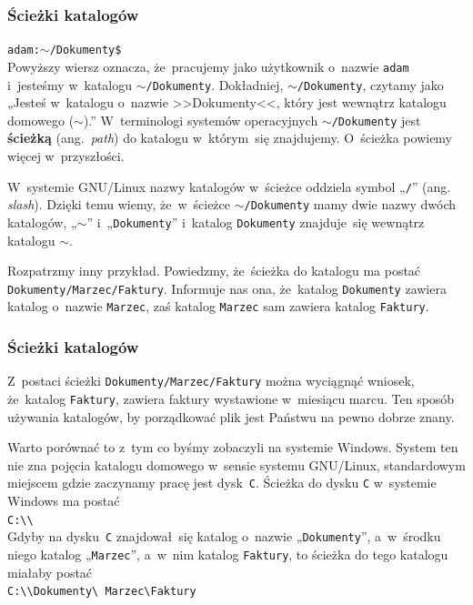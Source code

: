 \documentclass[10pt,t]{beamer}
\begin{document}
\begin{frame}
  \frametitle{Ścieżki katalogów}


  \texttt{adam:$\sim$/Dokumenty\$} \\
  Powyższy wiersz oznacza, że~pracujemy jako użytkownik o~nazwie
  \texttt{adam} i~jesteśmy w~katalogu \texttt{$\sim$/Dokumenty}. Dokładniej,
  \texttt{$\sim$/Dokumenty}, czytamy jako „Jesteś w~katalogu o~nazwie
  >>Dokumenty<<, który jest wewnątrz katalogu domowego ($\sim$).”
  W~terminologi systemów operacyjnych \texttt{$\sim$/Dokumenty} jest
  \textbf{ścieżką} (ang.~\textit{path}) do katalogu w~którym~się znajdujemy.
  O~ścieżka powiemy więcej w~przyszłości.

  W~systemie GNU/Linux nazwy katalogów w~ścieżce oddziela symbol
  „\texttt{/}” (ang. \textit{slash}). Dzięki temu wiemy, że~w~ścieżce
  \texttt{$\sim$/Dokumenty} mamy dwie nazwy dwóch katalogów, „$\sim$”
  i~„\texttt{Dokumenty}” i~katalog \texttt{Dokumenty} znajduje~się
  wewnątrz katalogu $\sim$.

  Rozpatrzmy inny przykład. Powiedzmy, że~ścieżka do katalogu ma postać
  \texttt{Dokumenty/Marzec/Faktury}. Informuje nas ona, że~katalog
  \texttt{Dokumenty} zawiera katalog o~nazwie \texttt{Marzec}, zaś katalog
  \texttt{Marzec} sam zawiera katalog \texttt{Faktury}.

\end{frame}





\begin{frame}
  \frametitle{Ścieżki katalogów}


  Z~postaci ścieżki \texttt{Dokumenty/Marzec/Faktury} można wyciągnąć
  wniosek, że~katalog \texttt{Faktury}, zawiera faktury wystawione
  w~miesiącu marcu. Ten sposób używania katalogów, by porządkować plik
  jest Państwu na pewno dobrze znany.

  Warto porównać to z~tym co byśmy zobaczyli na systemie Windows.
  System ten nie zna pojęcia katalogu domowego w~sensie systemu GNU/Linux,
  standardowym miejscem gdzie zaczynamy pracę jest dysk~\texttt{C}.
  Ścieżka do dysku \texttt{C} w~systemie Windows ma postać \\
  \texttt{C:\textbackslash\textbackslash} \\

  Gdyby na dysku~\texttt{C} znajdował~się katalog o~nazwie
  „\texttt{Dokumenty}”, a~w~środku niego katalog „\texttt{Marzec}”,
  a~w~nim katalog \texttt{Faktury}, to ścieżka do tego katalogu miałaby
  postać \\
  \texttt{C:\textbackslash\textbackslash Dokumenty\textbackslash
    Marzec\textbackslash Faktury}

\end{frame}
\end{document}
